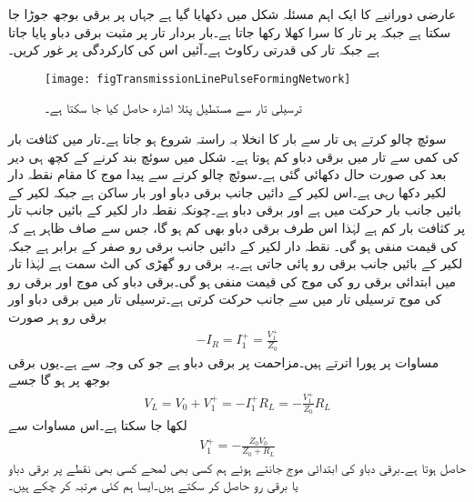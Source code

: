 عارضی دورانیے کا ایک اہم مسئلہ شکل  میں دکھایا گیا ہے جہاں  پر برقی بوجھ  جوڑا جا سکتا ہے جبکہ  پر تار کا سرا کھلا رکھا جاتا ہے۔بار بردار تار پر  مثبت برقی دباو پایا جاتا ہے جبکہ تار کی قدرتی رکاوٹ  ہے۔آئیں اس کی کارکردگی پر غور کریں۔  
\begin{figure}
\centering
\texttt{[image: figTransmissionLinePulseFormingNetwork]}
\caption{ترسیلی تار سے مستطیل پتلا اشارہ حاصل کیا جا سکتا ہے۔}
\label{شکل_ترسیلی_مستطیل_اشارہ}
\end{figure}
سوئچ چالو کرتے ہی تار سے  بار کا انخلا بہ راستہ  شروع ہو جاتا ہے۔تار میں کثافت بار کی کمی سے تار میں برقی دباو کم ہوتا ہے۔ شکل  میں سوئچ بند کرنے کے کچھ ہی دیر بعد کی صورت حال دکھائی گئی ہے۔سوئچ چالو کرنے سے پیدا موج کا مقام نقطہ دار لکیر  دکھا رہی ہے۔اس لکیر کے دائیں جانب برقی دباو  اور بار ساکن ہے جبکہ لکیر کے بائیں جانب بار حرکت میں ہے اور برقی دباو  ہے۔چونکہ نقطہ دار لکیر کے بائیں جانب تار پر کثافت بار کم ہے لہٰذا اس طرف برقی دباو بھی کم ہو گا، جس سے صاف ظاہر ہے کہ  کی قیمت منفی ہو گی۔ نقطہ دار لکیر کے دائیں جانب برقی رو صفر کے برابر ہے جبکہ لکیر کے بائیں جانب برقی رو پائی جاتی ہے۔یہ برقی رو گھڑی کی الٹ سمت ہے لہٰذا تار میں ابتدائی برقی رو کی موج  کی قیمت منفی ہو گی۔برقی دباو کی موج  اور برقی رو کی موج   ترسیلی تار میں  سے  جانب حرکت کرتی ہے۔ترسیلی تار میں برقی دباو اور برقی رو ہر صورت 
\begin{align*}
-I_R=I_1^+=\frac{V_1^+}{Z_0}
\end{align*}
مساوات پر پورا اترتے ہیں۔مزاحمت  پر برقی دباو  ہے جو  کی وجہ سے ہے۔یوں برقی بوجھ پر  ہو گا جسے
\begin{align*}
V_L=V_0 +V_1^+ =-I_1^+ R_L=-\frac{V_1^+}{Z_0} R_L
\end{align*}
لکھا جا سکتا ہے۔اس مساوات سے
\begin{align}\label{مساوات_ترسیلی_ابتدائی_برقی_مستطیل_اشارہ}
V_1^+=-\frac{Z_0 V_0}{Z_0+R_L}
\end{align}
حاصل ہوتا ہے۔برقی دباو کی ابتدائی موج جانتے ہوئے ہم کسی بھی لمحے کسی بھی نقطے پر برقی دباو یا برقی رو حاصل کر سکتے ہیں۔ایسا ہم کئی مرتبہ کر چکے ہیں۔


